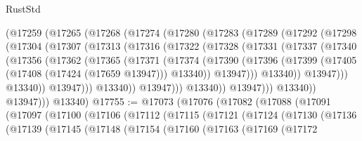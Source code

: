 \begin{lexlean}{RustStd}
\begin{coremodule}
            (@17259
              (@17265
                (@17268
                  (@17274
                    (@17280
                      (@17283
                        (@17289
                          (@17292
                            (@17298
                              (@17304
                                (@17307
                                  (@17313
                                    (@17316
                                      (@17322
                                        (@17328
                                          (@17331
                                            (@17337
                                              (@17340
                                                (@17356
                                                  (@17362
                                                    (@17365
                                                      (@17371
                                                        (@17374
                                                          (@17390
                                                            (@17396
                                                              (@17399
                                                                (@17405
                                                                  (@17408 (@17424 (@17659 @13947)))
                                                                  @13340))
                                                              @13947)))
                                                        @13340))
                                                    @13947)))
                                              @13340))
                                          @13947)))
                                    @13340))
                                @13947)))
                          @13340))
                      @13947)))
                @13340))
            @13947)))
      @13340)
@17755 := @17073
    (@17076
      (@17082
        (@17088
          (@17091
            (@17097
              (@17100
                (@17106
                  (@17112
                    (@17115
                      (@17121
                        (@17124
                          (@17130
                            (@17136
                              (@17139
                                (@17145
                                  (@17148
                                    (@17154
                                      (@17160
                                        (@17163
                                          (@17169
                                            (@17172

\end{coremodule}
\end{lexlean}
